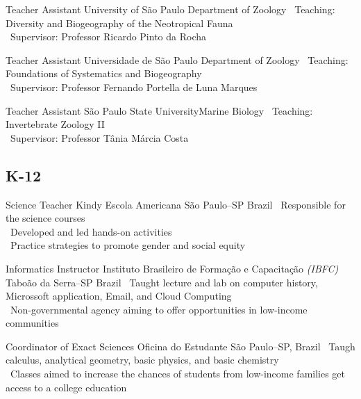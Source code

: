 \documentclass[11pt, letterpaper, sans]{moderncv}
\begin{document}
\vspace{.5em}

	{Teacher Assistant}
	{University of São Paulo}
	{Department of Zoology}
	{}
	{\textbullet~Teaching: Diversity and Biogeography of the Neotropical Fauna\\\textbullet~Supervisor: Professor Ricardo Pinto da Rocha
	}

\vspace{.5em}

	{Teacher Assistant}
	{Universidade de São Paulo}
	{Department of Zoology}
	{}
	{\textbullet~Teaching: Foundations of Systematics and Biogeography\\
		\textbullet~Supervisor: Professor Fernando Portella de Luna Marques
	}

\vspace{.5em}

	{Teacher Assistant}
	{São Paulo State University}{Marine Biology}
	{}
	{
		\textbullet~Teaching: Invertebrate Zoology II\\
		\textbullet~Supervisor: Professor Tânia Márcia Costa
	}

\vspace{.5em}
	\subsection{\textsc{K-12}}
\vspace{.5em}

	{Science Teacher}
	{Kindy Escola Americana}
	{São Paulo--SP}
	{Brazil}
	{
		\textbullet~Responsible for the science courses\\
		\textbullet~Developed and led hands-on activities\\
		\textbullet~Practice strategies to promote gender and social equity
	}

\vspace{.5em}

	{Informatics Instructor}
	{Instituto Brasileiro de Formação e Capacitação \emph{(IBFC)}}
	{Taboão da Serra--SP}
	{Brazil}
	{
		\textbullet~Taught lecture and lab  on computer history, Microssoft application, Email, and Cloud Computing\\
		\textbullet~Non-governmental agency aiming to offer opportunities in low-income communities
	}

\vspace{.5em}

	{Coordinator of Exact Sciences}
	{Oficina do Estudante}
	{São Paulo--SP, Brazil}
	{}
	{
		\textbullet~Taugh calculus, analytical geometry, basic physics, and basic chemistry\\
		\textbullet~Classes aimed to increase the chances of students from low-income families get access to a college education
	}
\end{document}
